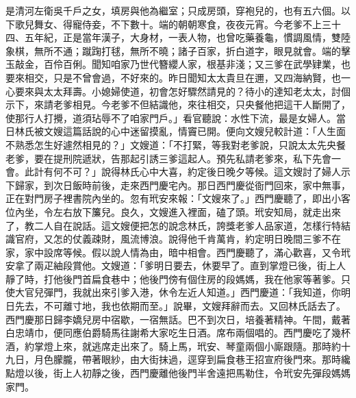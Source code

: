 \begin{showcontents}{}
是清河左衛吳千戶之女，填房與他為繼室；只成房頭，穿袍兒的，也有五六個。以下歌兒舞女、得寵侍妾，不下數十。端的朝朝寒食，夜夜元宵。今老爹不上三十四、五年紀，正是當年漢子，大身材，一表人物，也曾吃藥養龜，慣調風情，雙陸象棋，無所不通；蹴踘打毬，無所不曉；諸子百家，折白道字，眼見就會。端的擊玉敲金，百伶百俐。聞知咱家乃世代簪纓人家，根基非淺；又三爹在武學肄業，也要來相交，只是不曾會過，不好來的。昨日聞知太太貴旦在邇，又四海納賢，也一心要來與太太拜壽。小媳婦使道，初會怎好驟然請見的？待小的達知老太太，討個示下，來請老爹相見。今老爹不但結識他，來往相交，只央餐他把這干人斷開了，使那行人打攪，道須玷辱不了咱家門戶。」看官聽說：水性下流，最是女婦人。當日林氏被文嫂這篇話說的心中迷留摸亂，情竇已開。便向文嫂兒較計道：「人生面不熟悉怎生好遽然相見的？」文嫂道：「不打緊，等我對老爹說，只說太太先央餐老爹，要在提刑院遞狀，告那起引誘三爹這起人。預先私請老爹來，私下先會一會。此計有何不可？」說得林氏心中大喜，約定後日晚夕等候。這文嫂討了婦人示下歸家，到次日飯時前後，走來西門慶宅內。那日西門慶從衙門回來，家中無事，正在對門房子裡書院內坐的。忽有玳安來報：「文嫂來了。」西門慶聽了，即出小客位內坐，令左右放下簾兒。良久，文嫂進入裡面，磕了頭。玳安知局，就走出來了，教二人自在說話。這文嫂便把怎的說念林氏，誇獎老爹人品家道，怎樣行特結識官府，又怎的仗義疎財，風流博浪。說得他千肯萬肯，約定明日晚間三爹不在家，家中設席等候。假以說人情為由，暗中相會。西門慶聽了，滿心歡喜，又令玳安拿了兩疋紬段賞他。文嫂道：「爹明日要去，休要早了。直到掌燈已後，街上人靜了時，打他後門首扁食巷中；他後門傍有個住房的段媽媽，我在他家等著爹。只使大官兒彈門，我就出來引爹入港，休令左近人知道。」西門慶道：「我知道，你明日先去，不可離寸地，我也依期而至。」說畢，文嫂拜辭而去。又回林氏話去了。西門慶那日歸李嬌兒房中宿歇，一宿無話。巴不到次日，培養著精神。午間，戴著白忠靖巾，便同應伯爵騎馬往謝希大家吃生日酒。席布兩個唱的。西門慶吃了幾杯酒，約掌燈上來，就逃席走出來了。騎上馬，玳安、琴童兩個小廝跟隨。那時約十九日，月色朦朧，帶著眼紗，由大街抹過，逕穿到扁食巷王招宣府後門來。那時纔點燈以後，街上人初靜之後，西門慶離他後門半舍遠把馬勒住，令玳安先彈段媽媽家門。


\end{showcontents}
